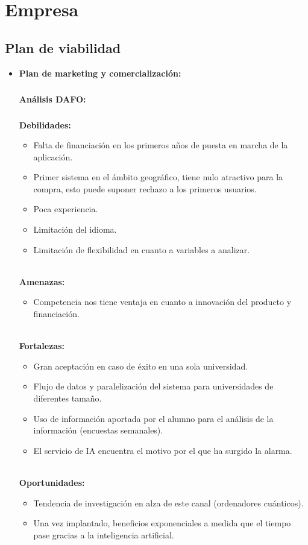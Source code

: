 \chapter{Empresa}

\section{Plan de viabilidad}
\begin{itemize}
\item{\textbf{Plan de marketing y comercialización:}}
\paragraph{}
\textbf{Análisis DAFO:}
\paragraph{}
\textbf{Debilidades:}
\begin{itemize}
\item{Falta de financiación en los primeros años de puesta en marcha de la aplicación.}
\item{Primer sistema en el ámbito geográfico, tiene nulo atractivo para la compra, esto puede suponer rechazo a los primeros usuarios.}
\item{Poca experiencia.}
\item{Limitación del idioma.}
\item{Limitación de flexibilidad en cuanto a variables a analizar.}
\end{itemize}\\
\textbf{Amenazas:}
\begin{itemize}
\item{Competencia nos tiene ventaja en cuanto a innovación del producto y financiación.}
\end{itemize}\\
\textbf{Fortalezas:}
\begin{itemize}
\item{Gran aceptación en caso de éxito en una sola universidad.}
\item{Flujo de datos y paralelización del sistema para universidades de diferentes tamaño.}
\item{Uso de información aportada por el alumno para el análisis de la información (encuestas semanales).}
\item{El servicio de IA encuentra el motivo por el que ha surgido la alarma.}
\end{itemize}\\
\textbf{	Oportunidades:}
\begin{itemize}
\item{Tendencia de investigación en alza de este canal (ordenadores cuánticos).}
\item{Una vez implantado, beneficios exponenciales a medida que el tiempo pase gracias a la inteligencia artificial.}
\end{itemize}\\
\end{itemize}

